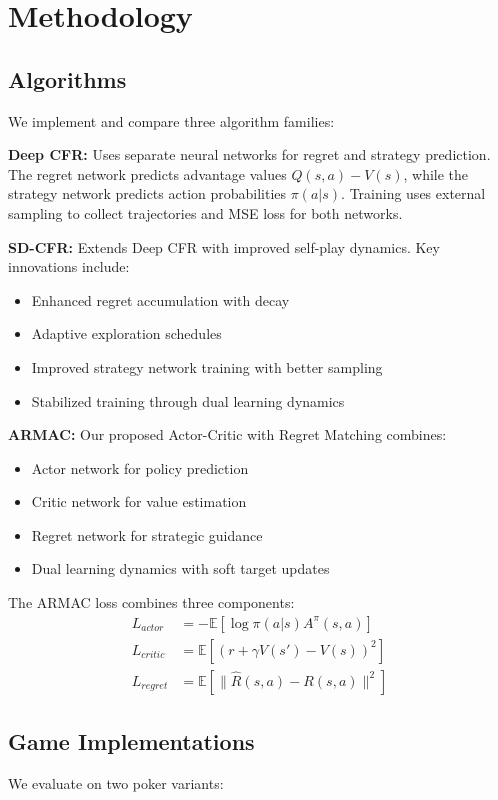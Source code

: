 \documentclass[10pt,twocolumn,conference]{IEEEtran}
\begin{document}
\section{Methodology}
\label{sec:methodology}

\subsection{Algorithms}
We implement and compare three algorithm families:

\textbf{Deep CFR:} Uses separate neural networks for regret and strategy prediction. The regret network predicts advantage values $Q(s,a) - V(s)$, while the strategy network predicts action probabilities $\pi(a|s)$. Training uses external sampling to collect trajectories and MSE loss for both networks.

\textbf{SD-CFR:} Extends Deep CFR with improved self-play dynamics. Key innovations include:
\begin{itemize}
    \item Enhanced regret accumulation with decay
    \item Adaptive exploration schedules
    \item Improved strategy network training with better sampling
    \item Stabilized training through dual learning dynamics
\end{itemize}

\textbf{ARMAC:} Our proposed Actor-Critic with Regret Matching combines:
\begin{itemize}
    \item Actor network for policy prediction
    \item Critic network for value estimation
    \item Regret network for strategic guidance
    \item Dual learning dynamics with soft target updates
\end{itemize}

The ARMAC loss combines three components:
\begin{align}
L_{actor} &= -\mathbb{E}[\log \pi(a|s) A^{\pi}(s,a)] \\
L_{critic} &= \mathbb{E}[(r + \gamma V(s') - V(s))^2] \\
L_{regret} &= \mathbb{E}[\|\hat{R}(s,a) - R(s,a)\|^2]
\end{align}

\subsection{Game Implementations}
We evaluate on two poker variants:
\end{document}
